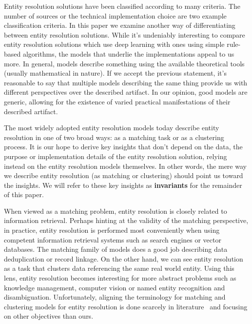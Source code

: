 \documentclass[journal]{IEEEtran}
\begin{document}
    Entity resolution solutions have been classified according to many criteria.
    The number of sources or the technical implementation choice are two example
    classification criteria.
    In this paper we examine another way of differentiating between entity
    resolution solutions.
    While it's undeniably interesting to compare entity resolution solutions
    which use deep learning with ones using simple rule-based algorithms, the
    models that underlie the implementations appeal to us more.
    In general, models describe something using the available theoretical tools
    (usually mathematical in nature).
    If we accept the previous statement, it's reasonable to say that multiple
    models describing the same thing provide us with different perspectives over
    the described artifact.
    In our opinion, good models are generic, allowing for the existence of
    varied practical manifestations of their described artifact.
    
    The most widely adopted entity resolution models today describe entity
    resolution in one of two broad ways: as a matching task or as a clustering
    process.
    It is our hope to derive key insights that don't depend on the data, the
    purpose or implementation details of the entity resolution solution, relying
    instead on the entity resolution models themselves.
    In other words, the mere way we describe entity resolution (as matching or
    clustering) should point us toward the insights.
    We will refer to these key insights as \textbf{invariants} for the remainder
    of this paper.
    
    When viewed as a matching problem, entity resolution is closely related to
    information retrieval.
    Perhaps hinting at the validity of the matching perspective, in practice,
    entity resolution is performed most conveniently when using competent
    information retrieval systems such as search engines or vector databases.
    The matching family of models does a good job describing data deduplication
    or record linkage.
    On the other hand, we can see entity resolution as a task that clusters data
    referencing the same real world entity.
    Using this lens, entity resolution becomes interesting for more abstract
    problems such as knowledge management, computer vision or named entity
    recognition and disambiguation.
    Unfortunately, aligning the terminology for matching and clustering models
    for entity resolution is done scarcely in
    literature~\cite{jedai2017,Ben2009Swoosh} and focusing on other objectives
    than ours.
    
\end{document}
